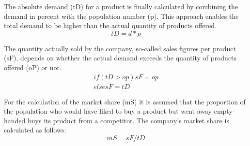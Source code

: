 The absolute demand (tD) for a product is finally calculated by combining the demand in percent with the population number (p). This approach enables the total demand to be higher than the actual quantity of products offered.
\begin{equation}
tD= d * p    
\end{equation}

The quantity actually sold by the company, so-called sales figures per product (sF), depends on whether the actual demand exceeds the quantity of products offered (oP) or not.
\begin{equation}
\begin{aligned}
if ( tD > op ) { sF = op } \\
else { sF = tD }    
\end{aligned}
\end{equation}

For the calculation of the market share (mS) it is assumed that the proportion of the population who would have liked to buy a product but went away empty-handed buys its product from a competitor. The company's market share is calculated as follows: 
\begin{equation}
mS = sF / tD   
\end{equation}

